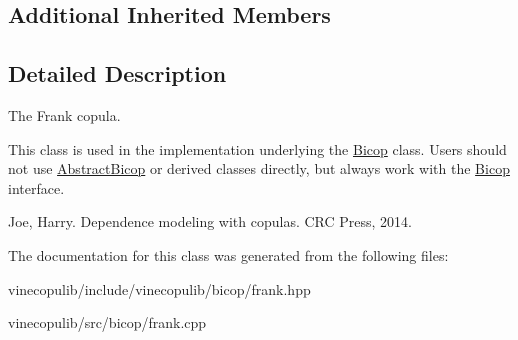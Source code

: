 \subsection*{Additional Inherited Members}


\subsection{Detailed Description}
The Frank copula. 

This class is used in the implementation underlying the \hyperlink{classvinecopulib_1_1_bicop}{Bicop} class. Users should not use \hyperlink{classvinecopulib_1_1_abstract_bicop}{Abstract\+Bicop} or derived classes directly, but always work with the \hyperlink{classvinecopulib_1_1_bicop}{Bicop} interface.

Joe, Harry. Dependence modeling with copulas. C\+R\+C Press, 2014. 

The documentation for this class was generated from the following files\+:\begin{DoxyCompactItemize}
\item 
vinecopulib/include/vinecopulib/bicop/frank.\+hpp\item 
vinecopulib/src/bicop/frank.\+cpp\end{DoxyCompactItemize}
